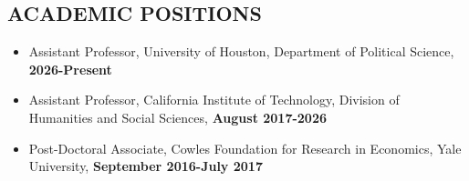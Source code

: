 \documentclass[margin, 10pt]{res} %
\begin{document}
\begin{resume}




\section{ACADEMIC POSITIONS}
\begin{itemize} \itemsep -2pt
\item[-] Assistant Professor, University of Houston, Department of
  Political Science, \textbf{2026-Present}  \\
\item[-] Assistant Professor, California Institute of
  Technology, Division of Humanities and Social Sciences,
  \textbf{August 2017-2026}  \\
\item[-] Post-Doctoral Associate, Cowles Foundation for Research in
  Economics, Yale University, \textbf{September 2016-July 2017}   \\
  \end{itemize}



\end{resume}
\end{document}
